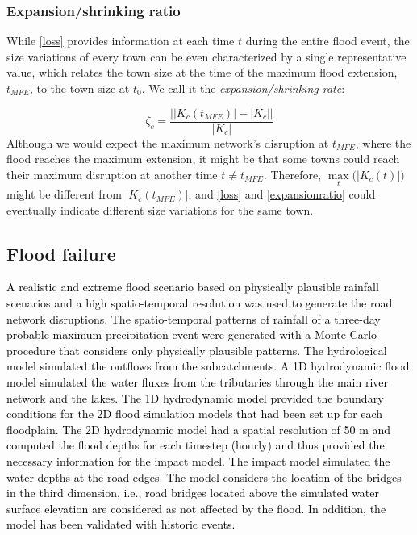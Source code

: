 \documentclass[twocolumn,fleqn,10pt]{wlscirep}
\begin{document}
\subsubsection*{Expansion/shrinking ratio}





While \cref{loss} provides information at each time $t$ during the entire flood event, the size variations of every town can be even characterized by a single representative value, which relates the town size at the time of the maximum flood extension\textcolor{black}{,} $t_{MFE}$\textcolor{black}{,} to the town size at $t_0$. We call it the \emph{expansion/shrinking rate}:

\begin{equation}
\zeta_c  = \frac{\displaystyle\left\lvert|K_c(t_{MFE})| - |K_c|\right\rvert}{|K_c|}
\label{expansionratio}
\end{equation}
Although we would expect the maximum network's disruption at $t_{MFE}$, where the flood reaches the maximum extension, it might be that some towns could reach their maximum disruption at another time $t \neq t_{MFE}$. Therefore, $\max\limits_{t} \big(|K_c(t)|\big)$ might be different from $|K_c(t_{MFE})|$, and \cref{loss} and \cref{expansionratio} could eventually indicate different size variations for the same town.






\subsection{Flood failure}
\label{flood_failure} 





\textcolor{black}{A realistic and extreme flood scenario \cite{Zischg} based on physically plausible rainfall scenarios and a high spatio-temporal resolution was used to generate the road network disruptions. The spatio-temporal patterns of rainfall of a three-day probable maximum precipitation event were generated with a Monte Carlo procedure that considers only physically plausible patterns. The hydrological model simulated the outflows from the subcatchments. A 1D hydrodynamic flood model simulated the water fluxes from the tributaries through the main river network and the lakes. The 1D hydrodynamic model provided the boundary conditions for the 2D flood simulation models that had been set up for each floodplain. The 2D hydrodynamic model had a spatial resolution of 50 m and computed the flood depths for each timestep (hourly)  and thus provided the necessary information for the impact model. The impact model simulated the water depths at the road edges. The model considers the location of the bridges in the third dimension, i.e., road bridges located above the simulated water surface elevation are considered as not affected by the flood. In addition, the model has been validated with historic events.}
\end{document}
